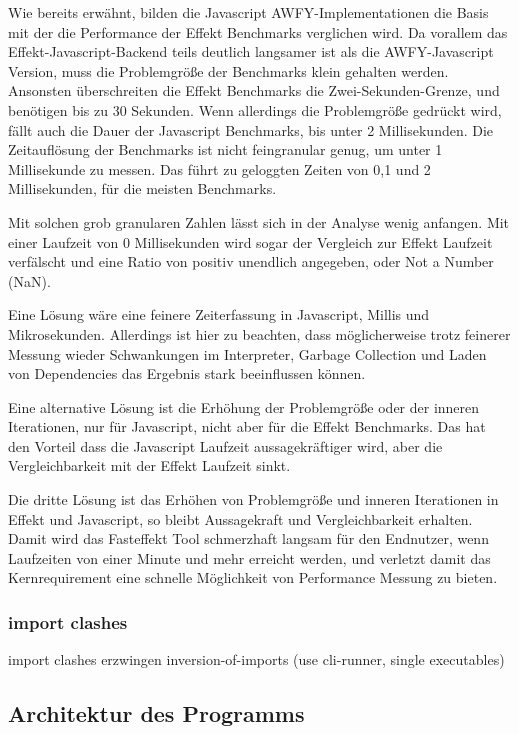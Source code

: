 Wie bereits erwähnt, bilden die Javascript AWFY-Implementationen die Basis mit der die Performance der Effekt Benchmarks verglichen wird.
Da vorallem das Effekt-Javascript-Backend teils deutlich langsamer ist als die AWFY-Javascript Version, muss die Problemgröße der Benchmarks klein gehalten werden. Ansonsten überschreiten die Effekt Benchmarks die Zwei-Sekunden-Grenze, und benötigen bis zu 30 Sekunden. Wenn allerdings die Problemgröße gedrückt wird, fällt auch die Dauer der Javascript Benchmarks, bis unter 2 Millisekunden. Die Zeitauflösung der Benchmarks ist nicht feingranular genug, um unter 1 Millisekunde zu messen. Das führt zu geloggten Zeiten von 0,1 und 2 Millisekunden, für die meisten Benchmarks. 

Mit solchen grob granularen Zahlen lässt sich in der Analyse wenig anfangen. Mit einer Laufzeit von 0 Millisekunden wird sogar der Vergleich zur Effekt Laufzeit verfälscht und eine Ratio von positiv unendlich angegeben, oder Not a Number (NaN).

Eine Lösung wäre eine feinere Zeiterfassung in Javascript, Millis und Mikrosekunden. Allerdings ist hier zu beachten, dass möglicherweise trotz feinerer Messung wieder Schwankungen im Interpreter, Garbage Collection und Laden von Dependencies das Ergebnis stark beeinflussen können.

Eine alternative Lösung ist die Erhöhung der Problemgröße oder der inneren Iterationen, nur für Javascript, nicht aber für die Effekt Benchmarks.
Das hat den Vorteil dass die Javascript Laufzeit aussagekräftiger wird, aber die Vergleichbarkeit mit der Effekt Laufzeit sinkt.

Die dritte Lösung ist das Erhöhen von Problemgröße und inneren Iterationen in Effekt und Javascript, so bleibt Aussagekraft und Vergleichbarkeit erhalten.
Damit wird das Fasteffekt Tool schmerzhaft langsam für den Endnutzer, wenn Laufzeiten von einer Minute und mehr erreicht werden, und verletzt damit das Kernrequirement eine schnelle Möglichkeit von Performance Messung zu bieten.

\subsubsection{ import clashes}
import clashes erzwingen inversion-of-imports (use cli-runner, single executables)

\subsection{Architektur des Programms}
